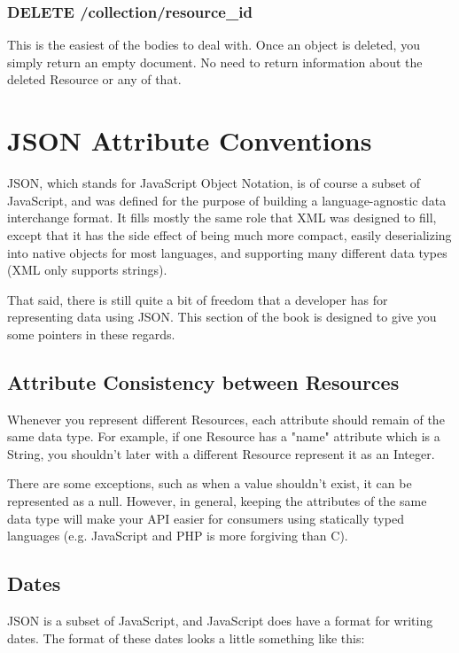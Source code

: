 \documentclass{book}
\begin{document}
\subsubsection{DELETE /collection/resource\_id}

This is the easiest of the bodies to deal with. Once an object is deleted, you simply return an empty document. No need to return information about the deleted Resource or any of that.


\section{JSON Attribute Conventions}

JSON, which stands for JavaScript Object Notation, is of course a subset of JavaScript, and was defined for the purpose of building a language-agnostic data interchange format. It fills mostly the same role that XML was designed to fill, except that it has the side effect of being much more compact, easily deserializing into native objects for most languages, and supporting many different data types (XML only supports strings).

That said, there is still quite a bit of freedom that a developer has for representing data using JSON. This section of the book is designed to give you some pointers in these regards.

\subsection{Attribute Consistency between Resources}

Whenever you represent different Resources, each attribute should remain of the same data type. For example, if one Resource has a "name" attribute which is a String, you shouldn't later with a different Resource represent it as an Integer.

There are some exceptions, such as when a value shouldn't exist, it can be represented as a null. However, in general, keeping the attributes of the same data type will make your API easier for consumers using statically typed languages (e.g. JavaScript and PHP is more forgiving than C).

\subsection{Dates}

JSON is a subset of JavaScript, and JavaScript does have a format for writing dates. The format of these dates looks a little something like this:
\end{document}
